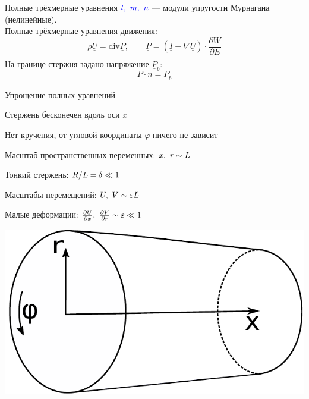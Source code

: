 \documentclass[usenames,dvipsnames]{beamer}
\newcommand{\vect}[1]{\underline{#1}}
\newcommand{\tens}[1]{\underline{\underline{#1}}}
\newcommand{\divg}{\text{div}}
\newcommand{\pdiff}[2]{\frac{\partial #1}{\partial #2}}
\begin{document}
\begin{frame}{Полные трёхмерные уравнения}
$\color{blue}l,\ m,\ n$ --- модули упругости Мурнагана (нелинейные).\\
\vspace{1mm}
\normalsize
Полные трёхмерные уравнения движения:
\begin{equation}\nonumber
\rho\ddot{\vect{U}} = \divg\tens{P}, \qquad \tens{P} = (\tens{I} + \nabla\vect{U}) \cdot \pdiff{W}{\tens{E}}
\end{equation}
На границе стержня задано напряжение $\vect{P}_b$:
\begin{equation}\nonumber
\tens{P}\cdot \vect{n} = \vect{P}_b
\end{equation}
\end{frame}


\begin{frame}{Упрощение полных уравнений}
\begin{itemize}%
	\hspace{-3mm}
	\begin{minipage}{.53\textwidth}
	\item Стержень бесконечен вдоль оси $x$
	\item Нет кручения, от угловой координаты $\varphi$ ничего не зависит
	\item Масштаб пространственных переменных: $\color{black}x,\ r \sim L$
	\item Тонкий стержень: $\color{black}R/L = \delta \ll 1$
	\item Масштабы перемещений: $\color{black}U,\ V \sim \varepsilon L$
	\item Малые деформации: $\color{black}\pdiff{U}{x},\ \pdiff{V}{r} \sim \varepsilon \ll 1$
	\end{minipage}
	\hspace{3mm}
	\begin{minipage}{.36\textwidth}
		\includegraphics[width=\linewidth]{figures/1_RodSchematic}\\

\end{minipage}
\end{itemize}
\end{frame}
\end{document}
